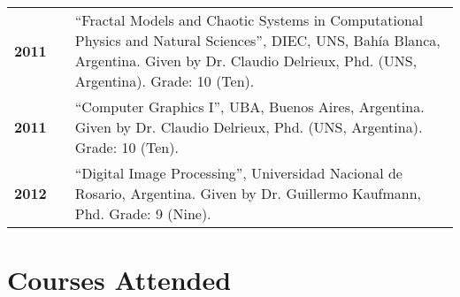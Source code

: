 \documentclass[a4paper,12pt]{article}
\begin{document}
\begin{tabular}{lcp{12 cm}}
\bf{2011}& & \textquotedblleft Fractal Models and Chaotic Systems in Computational Physics and Natural Sciences\textquotedblright, DIEC, UNS, Bah\'ia Blanca, Argentina. Given by Dr. Claudio Delrieux, Phd. (UNS, Argentina). Grade: 10 (Ten).\\
\bf{2011}& & \textquotedblleft Computer Graphics I\textquotedblright, UBA, Buenos Aires, Argentina. Given by Dr. Claudio Delrieux, Phd. (UNS, Argentina). Grade: 10 (Ten).\\
\bf{2012}& & \textquotedblleft Digital Image Processing\textquotedblright, Universidad Nacional de Rosario, Argentina. Given by Dr. Guillermo Kaufmann, Phd. Grade: 9 (Nine).\\
\end{tabular}



\section*{Courses Attended}
\end{document}
